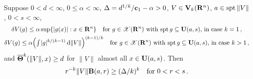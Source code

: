 \begin{lemma}
    \label{al:8.3}
    Suppose $0 < d < \infty$, $0 \le \alpha < \infty$, $\Delta = d^{1/k} / \mathbf{c}_1 - \alpha
    > 0$, $V \in \mathbf{V}_{k}(\mathbf{R}^{n})$, $a \in \operatorname{spt} \|V\|$, $0 < s < \infty$,
    \begin{gather*}
        \delta V(g) \le \alpha \sup \{ |g(x)| : x \in \mathbf{R}^{n} \} \quad \text{for $g \in
        \mathscr{X}(\mathbf{R}^{n})$ with $\operatorname{spt} g \subseteq \mathbf{U}(a,s)$, in case $k = 1$} \,, \\
        \delta V(g) \le \alpha \Big( {\textstyle\int_{}^{}} |g|^{k/(k-1)} \,\mathrm{d} \|V\|
        \Big)^{(k-1)/k} \quad \text{for $g \in \mathscr{X}(\mathbf{R}^{n})$ with $\operatorname{spt} g \subseteq
        \mathbf{U}(a,s)$, in case $k > 1$} \,,
    \end{gather*}
    and $\boldsymbol{\overline{\Theta}}^{k}(\|V\|,x) \ge d$ for $\|V\|$ almost all $x \in \mathbf{U}(a,s)$. Then
    \begin{displaymath}
        r^{-k} \|V\| \mathbf{B}(a,r) \ge (\Delta/k)^{k} \quad \text{for $0 < r < s$} \,.
    \end{displaymath}
\end{lemma}

